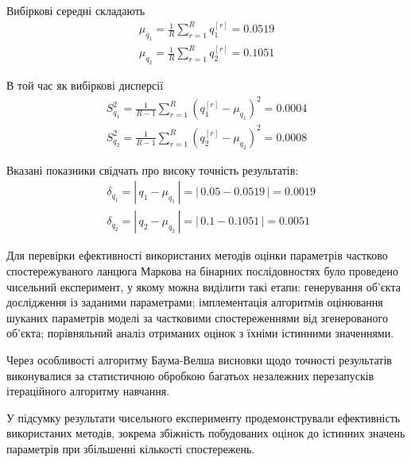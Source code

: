 Вибіркові середні складають
\begin{gather*}
    \mu_{q_1} = \frac{1}{R} \sum\limits_{r=1}^R q^{[r]}_1 = 0.0519 \\
    \mu_{q_2} = \frac{1}{R} \sum\limits_{r=1}^R q^{[r]}_2 = 0.1051 
\end{gather*}

В той час як вибіркові дисперсії
\begin{gather*}
    S^2_{q_1} = \frac{1}{R-1} \sum\limits_{r=1}^R \left( q^{[r]}_1 - \mu_{q_1} \right)^2 = 0.0004 \\
    S^2_{q_2} = \frac{1}{R-1} \sum\limits_{r=1}^R \left( q^{[r]}_2 - \mu_{q_2} \right)^2 = 0.0008 
\end{gather*}

Вказані показники свідчать про високу точність результатів:
\begin{align*}
    &\delta_{q_1} = \left|\, q_1-\mu_{q_1}\, \right| = \left|\, 0.05-0.0519\, \right| = 0.0019 \\
    &\delta_{q_2} = \left|\, q_2-\mu_{q_2}\, \right| = \left|\, 0.1-0.1051\, \right| = 0.0051
\end{align*}

\chapconclude{\ref{chap: practice}}

Для перевірки ефективності використаних методів оцінки параметрів частково спостережуваного ланцюга Маркова на бінарних послідовностях було проведено чисельний експеримент, у якому можна виділити такі етапи: генерування об'єкта дослідження із заданими параметрами; імплементація алгоритмів оцінювання шуканих параметрів моделі за частковими спостереженнями від згенерованого об'єкта; порівняльний аналіз отриманих оцінок з їхніми істинними значеннями.

Через особливості алгоритму Баума-Велша висновки щодо точності результатів виконувалися за статистичною обробкою багатьох незалежних перезапусків ітераційного алгоритму навчання.

У підсумку результати чисельного експерименту продемонстрували ефективність використаних методів, зокрема збіжність побудованих оцінок до істинних значень параметрів при збільшенні кількості спостережень.